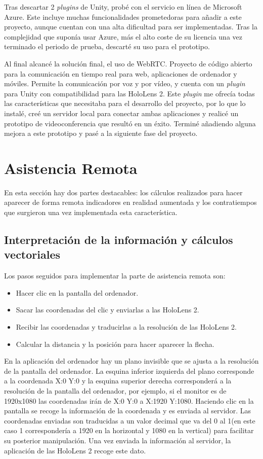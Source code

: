 Tras descartar 2 \textit{plugins} de Unity, probé con el servicio en línea de Microsoft Azure. Este incluye muchas funcionalidades prometedoras para añadir a este proyecto, aunque cuentan con una alta dificultad para ser implementadas. Tras la complejidad que suponía usar Azure, más el alto coste de su licencia una vez terminado el periodo de prueba, descarté su uso para el prototipo.

Al final alcancé la solución final, el uso de WebRTC. Proyecto de código abierto para la comunicación en tiempo real para web, aplicaciones de ordenador y móviles. Permite la comunicación por voz y por vídeo, y cuenta con un \textit{plugin} para Unity con compatibilidad para las HoloLens 2. Este \textit{plugin} me ofrecía todas las características que necesitaba para el desarrollo del proyecto, por lo que lo instalé, creé un servidor local para conectar ambas aplicaciones y realicé un prototipo de videoconferencia que resultó en un éxito. Terminé añadiendo alguna mejora a este prototipo y pasé a la siguiente fase del proyecto.

\section{Asistencia Remota}

En esta sección hay dos partes destacables: los cálculos realizados para hacer aparecer de forma remota indicadores en realidad aumentada y los contratiempos que surgieron una vez implementada esta característica. 

\subsection{Interpretación de la información y cálculos vectoriales}

Los pasos seguidos para implementar la parte de asistencia remota son:

\begin{itemize}
	\item Hacer clic en la pantalla del ordenador.
	\item Sacar las coordenadas del clic y enviarlas a las HoloLens 2.
	\item Recibir las coordenadas y traducirlas a la resolución de las HoloLens 2.
	\item Calcular la distancia y la posición para hacer aparecer la flecha.
\end{itemize}

En la aplicación del ordenador hay un plano invisible que se ajusta a la resolución de la pantalla del ordenador. La esquina inferior izquierda del plano corresponde a la coordenada X:0 Y:0 y la esquina superior derecha corresponderá a la resolución de la pantalla del ordenador, por ejemplo, si el monitor es de 1920x1080 las coordenadas irán de X:0 Y:0 a X:1920 Y:1080. Haciendo clic en la pantalla se recoge la información de la coordenada y es enviada al servidor. Las coordenadas enviadas son traducidas a un valor decimal que va del 0 al 1(en este caso 1 correspondería a 1920 en la horizontal y 1080 en la vertical) para facilitar su posterior manipulación. Una vez enviada la información al servidor, la aplicación de las HoloLens 2 recoge este dato.

